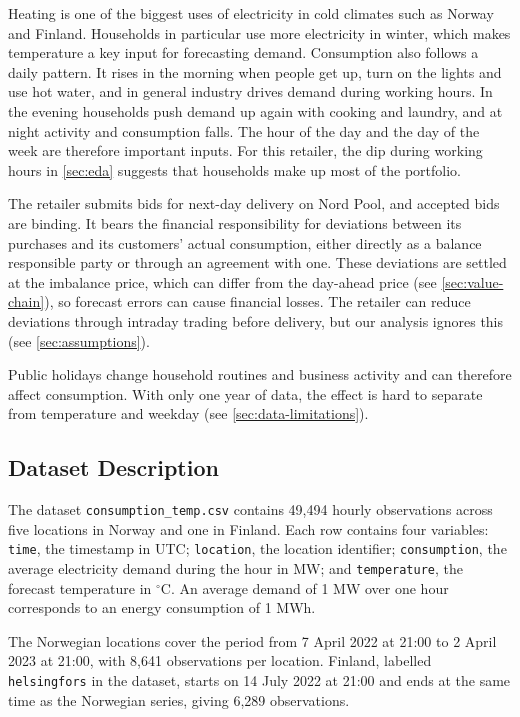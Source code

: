 \documentclass[11pt,a4paper]{article}
\begin{document}
Heating is one of the biggest uses of electricity in cold climates such as Norway and Finland. Households in particular use more electricity in winter, which makes temperature a key input for forecasting demand. Consumption also follows a daily pattern. It rises in the morning when people get up, turn on the lights and use hot water, and in general industry drives demand during working hours. In the evening households push demand up again with cooking and laundry, and at night activity and consumption falls. The hour of the day and the day of the week are therefore important inputs. For this retailer, the dip during working hours in \cref{sec:eda} suggests that households make up most of the portfolio.

The retailer submits bids for next-day delivery on Nord Pool, and accepted bids are binding. It bears the financial responsibility for deviations between its purchases and its customers' actual consumption, either directly as a balance responsible party or through an agreement with one. These deviations are settled at the imbalance price, which can differ from the day-ahead price (see \cref{sec:value-chain}), so forecast errors can cause financial losses. The retailer can reduce deviations through intraday trading before delivery, but our analysis ignores this (see \cref{sec:assumptions}).

Public holidays change household routines and business activity and can therefore affect consumption. With only one year of data, the effect is hard to separate from temperature and weekday (see \cref{sec:data-limitations}).

\subsection{Dataset Description}
The dataset \texttt{consumption\_temp.csv} contains 49,494 hourly
observations across five locations in Norway and one in Finland. Each row
contains four variables: \texttt{time}, the timestamp in UTC;
\texttt{location}, the location identifier; \texttt{consumption},
the average electricity demand during the hour in MW; and
\texttt{temperature}, the forecast temperature in $^\circ$C.
An average demand of 1 MW over one hour corresponds to an energy
consumption of 1 MWh.

The Norwegian locations cover the period from 7 April 2022 at
21:00 to 2 April 2023 at 21:00, with 8,641 observations per
location. Finland, labelled \texttt{helsingfors} in the dataset,
starts on 14 July 2022 at 21:00 and ends at the same time as the
Norwegian series, giving 6,289 observations.
\end{document}
